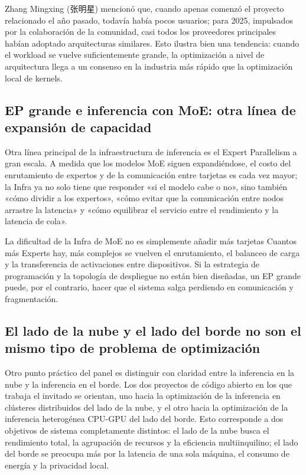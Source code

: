 \documentclass[a4paper]{article}
\begin{document}
Zhang Mingxing (张明星) mencionó que, cuando apenas comenzó el proyecto relacionado el año pasado, todavía había pocos usuarios; para 2025, impulsados por la colaboración de la comunidad, casi todos los proveedores principales habían adoptado arquitecturas similares. Esto ilustra bien una tendencia: cuando el workload se vuelve suficientemente grande, la optimización a nivel de arquitectura llega a un consenso en la industria más rápido que la optimización local de kernels.

\subsection{EP grande e inferencia con MoE: otra línea de expansión de capacidad}
Otra línea principal de la infraestructura de inferencia es el Expert Parallelism a gran escala. A medida que los modelos MoE siguen expandiéndose, el costo del enrutamiento de expertos y de la comunicación entre tarjetas es cada vez mayor; la Infra ya no solo tiene que responder «si el modelo cabe o no», sino también «cómo dividir a los expertos», «cómo evitar que la comunicación entre nodos arrastre la latencia» y «cómo equilibrar el servicio entre el rendimiento y la latencia de cola».

\begin{warningbox}{La dificultad de la Infra de MoE no es simplemente añadir más tarjetas}
Cuantos más Experts hay, más complejos se vuelven el enrutamiento, el balanceo de carga y la transferencia de activaciones entre dispositivos. Si la estrategia de programación y la topología de despliegue no están bien diseñadas, un EP grande puede, por el contrario, hacer que el sistema salga perdiendo en comunicación y fragmentación.
\end{warningbox}

\subsection{El lado de la nube y el lado del borde no son el mismo tipo de problema de optimización}
Otro punto práctico del panel es distinguir con claridad entre la inferencia en la nube y la inferencia en el borde. Los dos proyectos de código abierto en los que trabaja el invitado se orientan, uno hacia la optimización de la inferencia en clústeres distribuidos del lado de la nube, y el otro hacia la optimización de la inferencia heterogénea CPU-GPU del lado del borde. Esto corresponde a dos objetivos de sistema completamente distintos: el lado de la nube busca el rendimiento total, la agrupación de recursos y la eficiencia multiinquilino; el lado del borde se preocupa más por la latencia de una sola máquina, el consumo de energía y la privacidad local.
\end{document}
